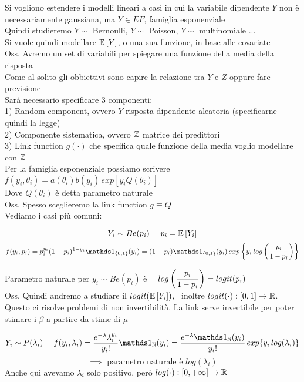 
Si vogliono estendere i modelli lineari a casi in cui la variabile dipendente $Y$ non è necessariamente gaussiana, ma $Y\in EF$, famiglia esponenziale\\
Quindi studieremo $Y \sim $ Bernoulli, $Y \sim$ Poisson, $Y\sim$ multinomiale ...\\

Si vuole quindi modellare $\mathbb{E} \left[ Y \right]$, o una sua funzione, in base alle covariate\\

Oss. Avremo un set di variabili per spiegare una funzione della media della risposta\\
Come al solito gli obbiettivi sono capire la relazione tra $Y$ e $Z$ oppure fare previsione\\

Sarà necessario specificare 3 componenti:\\
1) Random component, ovvero $Y$ risposta dipendente aleatoria (specificarne quindi la legge)\\
2) Componente sistematica, ovvero $\mathbb Z$ matrice dei predittori\\
3) Link function $g(\cdot)$ che specifica quale funzione della media voglio modellare con $\mathbb Z$\\

Per la famiglia esponenziale possiamo scrivere $f(y_i,\theta_i)=a(\theta_i)b(y_i)\, exp[y_i Q(\theta_i)]$\\
Dove $Q(\theta_i)$ è detta parametro naturale\\
Oss. Spesso sceglieremo la link function $g\equiv Q$\\

Vediamo i casi più comuni:

\[
Y_i \sim Be(p_i) \ \ \ \ p_i=\E{Y_i}
\]
\[
f(y_i,p_i)=p_i^{y_i}(1-p_i)^{1-y_i} \II_{\{0,1\}}(y_i)= (1-p_i)\II_{\{0,1\}}(y_i) \, exp \OOO y_i\, log \O\frac{p_i}{1-p_i}\C \CCC\]

Parametro naturale per $y_i \sim Be(p_i)$ è \ \ $log\left(\dfrac{p_i}{1-p_i}\right) = logit(p_i)$\\
Oss. Quindi andremo a studiare il $logit(\mathbb{E} \left[ Y_i \right])$, \ inoltre $logit(\cdot):[0,1]\to \mathbb R$.
Questo ci risolve problemi di non invertibilità. La link serve invertibile per poter stimare i $\beta$ a partire da stime di $\mu$

\[
Y_i \sim P(\lambda_i) \ \ \ \ f(y_i,\lambda_i) = \frac{e^{-\lambda}\lambda_i^{y_i}}{y_i!} \II_{\NN}(y_i) = \frac{e^{-\lambda}\II_{\NN}(y_i)}{y_i!} \, exp\{y_i\, log(\lambda_i)\}
\]
\[
\implies \text{ parametro naturale è } log(\lambda_i)
\]
Anche qui avevamo $\lambda_i$ solo positivo, però $log(\cdot):[0,+\infty]\to \mathbb R$\\ \\



